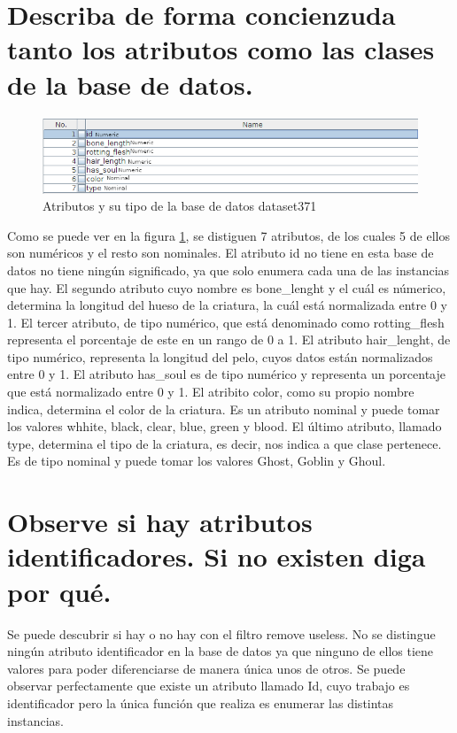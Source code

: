 \documentclass[11pt,twoside,a4paper]{book}
\begin{document}
\section{Describa de forma concienzuda tanto los atributos como las clases de la base de datos.}
\begin{figure}[H]
   \includegraphics[width=\textwidth]{ejercicio4_4.png}
	\caption{Atributos y su tipo de la base de datos dataset371}
	\label{Fig9}
\end{figure}
Como se puede ver en la figura \ref{Fig9}, se distiguen 7 atributos, de los cuales
5 de ellos son numéricos y el resto son nominales. El atributo id no tiene en esta
base de datos no tiene ningún significado, ya que solo enumera cada una de las instancias
que hay. El segundo atributo cuyo nombre es bone\_lenght y el cuál es númerico,
determina la longitud del hueso de la criatura, la cuál está normalizada entre 0
y 1. El tercer atributo, de tipo numérico, que está denominado como rotting\_flesh
representa el porcentaje de este en un rango de 0 a 1.
El atributo hair\_lenght, de tipo numérico, representa la longitud del pelo, cuyos
datos están normalizados entre 0 y 1.
El atributo has\_soul es de tipo numérico y representa un porcentaje que está normalizado
entre 0 y 1. El atribito color, como su propio nombre indica, determina el color
de la criatura. Es un atributo nominal y puede tomar los valores whhite, black, clear,
blue, green y blood.
El último atributo, llamado type, determina el tipo de la criatura, es decir, nos indica
a que clase pertenece. Es de tipo nominal y puede tomar los valores Ghost, Goblin y Ghoul.

\section{Observe si hay atributos identificadores. Si no existen diga por qué.}
Se puede descubrir si hay o no hay con el filtro remove useless.
No se distingue ningún atributo identificador en la base de datos ya que ninguno
de ellos tiene valores para poder diferenciarse de manera única unos de otros. Se puede
observar perfectamente que existe un atributo llamado Id, cuyo trabajo es identificador
pero la única función que realiza es enumerar las distintas instancias.
\end{document}
